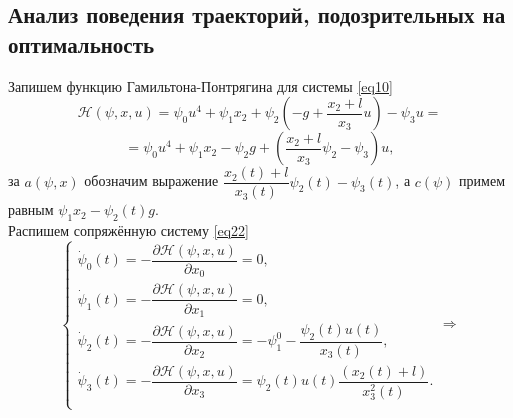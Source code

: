 \documentclass[a4paper,12pt]{article}
\begin{document}
\subsection{Анализ поведения траекторий, подозрительных на оптимальность} 
Запишем функцию Гамильтона-Понтрягина для системы \eqref{eq10} 
\[ \mathcal{H}(\psi, x, u) = \psi_0 u^4 + \psi_1 x_2 + \psi_2\left(-g + \dfrac{x_2 + l}{x_3}u\right) - \psi_3u = \]
\[ = \psi_0 u^4 + \psi_1 x_2 - \psi_2 g + \left(\dfrac{x_2 + l}{x_3}\psi_2 - \psi_3\right)u,\] 
за $a(\psi, x)$ обозначим выражение $\dfrac{x_2(t) 
+ l}{x_3(t)}\psi_2(t) - \psi_3(t)$, а $c(\psi)$ примем равным $\psi_1 x_2 -\psi_2(t)g$. \\
Распишем сопряжённую систему \eqref{eq22}
$$\begin{cases}
	\dot{\psi}_0(t) = - \dfrac{\partial{\mathcal{H}(\psi, x, u)}}{\partial{x_0}} = 0, \\
	\dot{\psi}_1(t) = - \dfrac{\partial{\mathcal{H}(\psi, x, u)}}{\partial{x_1}} = 0, \\
	\dot{\psi}_2(t) = - \dfrac{\partial{\mathcal{H}(\psi, x, u)}}{\partial{x_2}} = -\psi_1^0 - \dfrac{\psi_{2}(t)u(t)}{x_{3}(t)}, \\
	\dot{\psi}_3(t) = - \dfrac{\partial{\mathcal{H}(\psi, x, u)}}{\partial{x_3}} = \psi_2(t)u(t) \dfrac{(x_2(t) + l)}{x_3^2(t)}. \\
\end{cases} \Rightarrow$$
\end{document}
